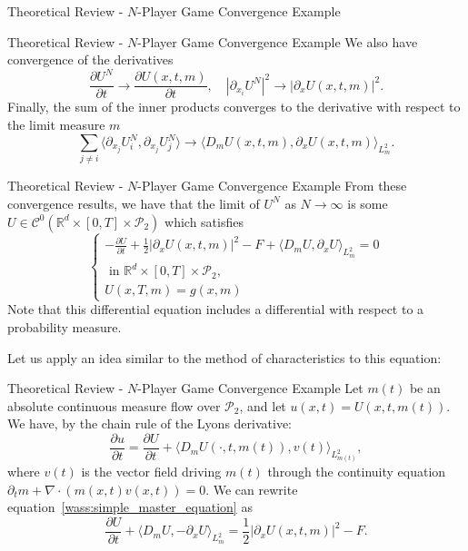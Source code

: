 \documentclass{beamer}
\newcommand{\RR}[0]{\mathbb{R}}
\begin{document}
{\begin{frame}{Theoretical Review - $N$-Player Game Convergence Example}
\end{frame}


\begin{frame}{Theoretical Review - $N$-Player Game Convergence Example}
We also have convergence of the derivatives
\begin{equation}
    \frac{\partial U^N}{\partial t} \to \frac{\partial U(x,t,m)}{\partial t}, \quad |\partial_{x_i} U^N|^2 \to |\partial_x U (x,t,m)|^2.
\end{equation}
Finally, the sum of the inner products converges to the derivative with respect to the limit measure $m$
\begin{equation}
    \sum_{j\neq i} \langle \partial_{x_j} U^N_i , \partial_{x_j} U^N_j \rangle \to \langle D_m U(x,t,m), \partial_x U(x, t, m) \rangle_{L^2_m}.
\end{equation}
\end{frame}

\begin{frame}{Theoretical Review - $N$-Player Game Convergence Example}
    From these convergence results, we have that the limit of $U^N$ as $N \to \infty$
is some $U\in \mathcal{C}^0(\RR^d \times [0,T] \times \mathcal{P}_2) $
 which satisfies 
 \begin{equation}\label{wass:simple_master_equation}
    \begin{cases}
        - \frac{\partial U}{ \partial t} + \frac{1}{2} |\partial_x U(x,t,m)|^2 - F + \langle D_m U, \partial_x U \rangle_{L^2_m} = 0 \\\text{ in }\RR^d \times [0,T] \times \mathcal{P}_2,\\
        U(x,T,m) = g(x,m)
    \end{cases}
 \end{equation}
 Note that this differential equation includes a differential with respect to
 a probability measure.

 
  Let us apply an idea similar to the method of characteristics to this equation:

\end{frame}

\begin{frame}{Theoretical Review - $N$-Player Game Convergence Example}
      Let $m(t)$ be an absolute continuous measure flow over $\mathcal{P}_2$, and
  let $u(x,t) = U(x,t,m(t))$. We have, by the chain rule of the Lyons derivative:
\begin{equation}
    \frac{\partial u}{\partial t} = \frac{\partial U}{\partial t} + \langle D_m U (\cdot, t, m(t)), v(t) \rangle_{L^2_{m(t)}},
\end{equation}
    where $v(t)$ is the vector field driving $m(t)$ through the continuity equation $\partial_t m + \nabla \cdot( m(x,t) v(x,t) ) = 0$.
    We can rewrite equation~\eqref{wass:simple_master_equation} as 
\begin{equation}
    \frac{\partial U}{ \partial t} + \langle D_m U, - \partial_x U \rangle_{L^2_m} = \frac{1}{2} |\partial_x U(x,t,m)|^2 - F.
\end{equation}


\end{frame}}
\end{document}
